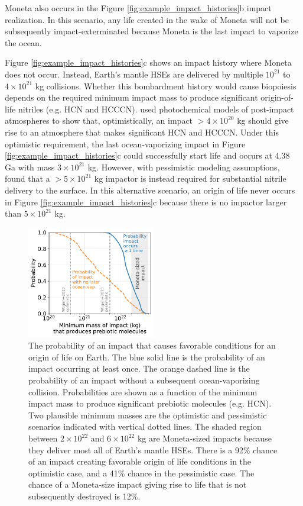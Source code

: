 \documentclass[manuscript]{aastex63}
\begin{document}
Moneta also occurs in the Figure \ref{fig:example_impact_histories}b impact realization. In this scenario, any life created in the wake of Moneta will not be subsequently impact-exterminated because Moneta is the last impact to vaporize the ocean.

Figure \ref{fig:example_impact_histories}c shows an impact history where Moneta does not occur. Instead, Earth's mantle HSEs are delivered by multiple $10^{21}$ to $4 \times 10^{21}$ kg collisions. Whether this bombardment history would cause biopoiesis depends on the required minimum impact mass to produce significant origin-of-life nitriles (e.g. HCN and HCCCN). \citet{Wogan_2023} used photochemical models of post-impact atmospheres to show that, optimistically, an impact $> 4 \times 10^{20}$ kg should give rise to an atmosphere that makes significant HCN and HCCCN. Under this optimistic requirement, the last ocean-vaporizing impact in Figure \ref{fig:example_impact_histories}c could successfully start life and occurs at 4.38 Ga with mass $3 \times 10^{21}$ kg. However, with pessimistic modeling assumptions, \citet{Wogan_2023} found that a $> 5 \times 10^{21}$ kg impactor is instead required for substantial nitrile delivery to the surface. In this alternative scenario, an origin of life never occurs in Figure \ref{fig:example_impact_histories}c because there is no impactor larger than $5 \times 10^{21}$ kg.

\begin{figure}
  \centering
  \includegraphics[width=0.5\textwidth]{figures/probabilities_of_impacts.pdf}
  \caption{The probability of an impact that causes favorable conditions for an origin of life on Earth. The blue solid line is the probability of an impact occurring at least once. The orange dashed line is the probability of an impact without a subsequent ocean-vaporizing collision. Probabilities are shown as a function of the minimum impact mass to produce significant prebiotic molecules (e.g. HCN). Two plausible minimum masses are the \citet{Wogan_2023} optimistic and pessimistic scenarios indicated with vertical dotted lines. The shaded region between $2 \times 10^{22}$ and $6 \times 10^{22}$ kg are Moneta-sized impacts because they deliver most all of Earth's mantle HSEs. There is a 92\% chance of an impact creating favorable origin of life conditions in the \citet{Wogan_2023} optimistic case, and a 41\% chance in the pessimistic case. The chance of a Moneta-size impact giving rise to life that is not subsequently destroyed is 12\%.}
  \label{fig:probabilities_of_impacts}
\end{figure}
\end{document}
